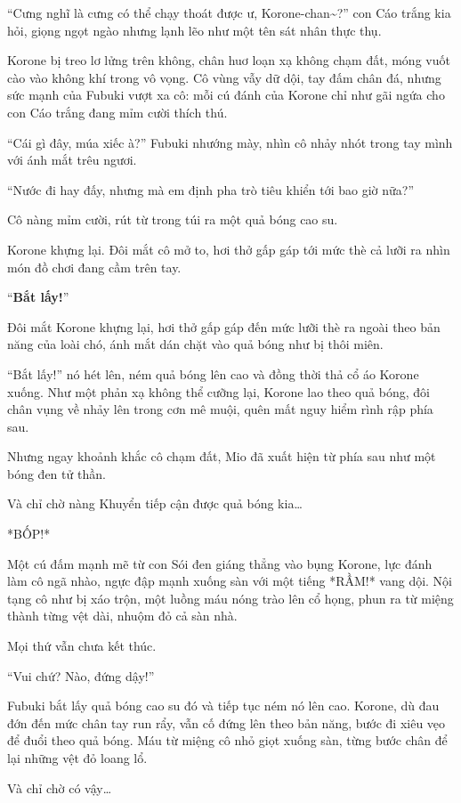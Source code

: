 \documentclass[../main.tex]{subfiles}
\begin{document}
``Cưng nghĩ là cưng có thể chạy thoát được ư, Korone-chan\~{}?'' con Cáo trắng kia hỏi, giọng ngọt ngào nhưng lạnh lẽo như một tên sát nhân thực thụ.

Korone bị treo lơ lửng trên không, chân huơ loạn xạ không chạm đất, móng vuốt cào vào không khí trong vô vọng. Cô vùng vẫy dữ dội, tay đấm chân đá, nhưng sức mạnh của Fubuki vượt xa cô: mỗi cú đánh của Korone chỉ như gãi ngứa cho con Cáo trắng đang mỉm cười thích thú.

``Cái gì đây, múa xiếc à?'' Fubuki nhướng mày, nhìn cô nhảy nhót trong tay mình với ánh mắt trêu ngươi.

``Nước đi hay đấy, nhưng mà em định pha trò tiêu khiển tới bao giờ nữa?''

Cô nàng mỉm cười, rút từ trong túi ra một quả bóng cao su.

Korone khựng lại. Đôi mắt cô mở to, hơi thở gấp gáp tới mức thè cả lưỡi ra nhìn món đồ chơi đang cầm trên tay.

``\textbf{Bắt lấy!}''

Đôi mắt Korone khựng lại, hơi thở gấp gáp đến mức lưỡi thè ra ngoài theo bản năng của loài chó, ánh mắt dán chặt vào quả bóng như bị thôi miên.

``Bắt lấy!'' nó hét lên, ném quả bóng lên cao và đồng thời thả cổ áo Korone xuống. Như một phản xạ không thể cưỡng lại, Korone lao theo quả bóng, đôi chân vụng về nhảy lên trong cơn mê muội, quên mất nguy hiểm rình rập phía sau.

Nhưng ngay khoảnh khắc cô chạm đất, Mio đã xuất hiện từ phía sau như một bóng đen tử thần.

Và chỉ chờ nàng Khuyển tiếp cận được quả bóng kia\dots

*BỐP!*

Một cú đấm mạnh mẽ từ con Sói đen giáng thẳng vào bụng Korone, lực đánh làm cô ngã nhào, ngực đập mạnh xuống sàn với một tiếng *RẦM!* vang dội. Nội tạng cô như bị xáo trộn, một luồng máu nóng trào lên cổ họng, phun ra từ miệng thành từng vệt dài, nhuộm đỏ cả sàn nhà.

Mọi thứ vẫn chưa kết thúc.

``Vui chứ? Nào, đứng dậy!''

Fubuki bắt lấy quả bóng cao su đó và tiếp tục ném nó lên cao. Korone, dù đau đớn đến mức chân tay run rẩy, vẫn cố đứng lên theo bản năng, bước đi xiêu vẹo để đuổi theo quả bóng. Máu từ miệng cô nhỏ giọt xuống sàn, từng bước chân để lại những vệt đỏ loang lổ.

Và chỉ chờ có vậy\dots
\end{document}
